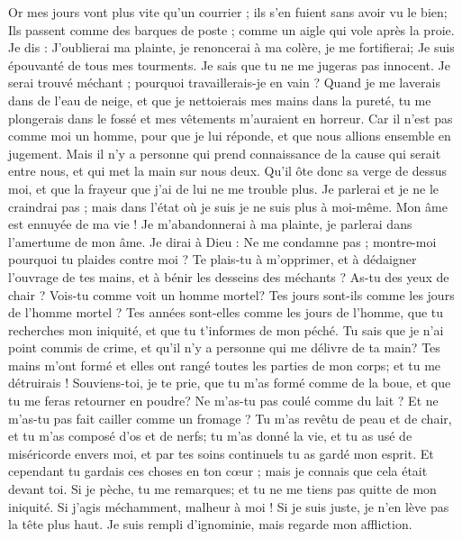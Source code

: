 \begin{multicols}{2}
Or mes jours vont plus vite qu'un courrier ; ils s'en fuient sans avoir vu le bien;
Ils passent comme des barques de poste ; comme un aigle qui vole après la proie.
 Je dis : J'oublierai ma plainte, je renoncerai à ma colère, je me fortifierai; 
Je suis épouvanté de tous mes tourments. Je sais que tu ne me jugeras pas innocent.
Je serai trouvé méchant ; pourquoi travaillerais-je en vain ?
Quand je me laverais dans de l'eau de neige, et que je nettoierais mes mains dans la pureté, 
tu me plongerais dans le fossé et mes vêtements m'auraient en horreur.
Car il n'est pas comme moi un homme, pour que je lui réponde, et que nous allions ensemble en jugement.
Mais il n'y a personne qui prend connaissance de la cause qui serait entre nous, et qui met la main sur nous deux.
Qu'il ôte donc sa verge de dessus moi, et que la frayeur que j'ai de lui ne me trouble plus.
Je parlerai et je ne le craindrai pas ; mais dans l'état où je suis je ne suis plus à moi-même. 
\VerseOne{}Mon âme est ennuyée de ma vie ! Je m'abandonnerai à ma plainte, je parlerai dans l'amertume de mon âme.
Je dirai à Dieu : Ne me condamne pas ; montre-moi pourquoi tu plaides contre moi ?
Te plais-tu à m'opprimer, et à dédaigner l'ouvrage de tes mains, et à bénir les desseins des méchants ?
As-tu des yeux de chair ? Vois-tu comme voit un homme mortel?
Tes jours sont-ils comme les jours de l'homme mortel ? Tes années sont-elles comme les jours de l'homme, 
que tu recherches mon iniquité, et que tu t'informes de mon péché.
Tu sais que je n'ai point commis de crime, et qu'il n'y a personne qui me délivre de ta main?
Tes mains m'ont formé et elles ont rangé toutes les parties de mon corps; et tu me détruirais  !
Souviens-toi, je te prie, que tu m'as formé comme de la boue, et que tu me feras retourner en poudre?
Ne m'as-tu pas coulé comme du lait ? Et ne m'as-tu pas fait cailler comme un fromage ?
Tu m'as revêtu de peau et de chair, et tu m'as composé d'os et de nerfs;
tu m'as donné la vie, et tu as usé de miséricorde envers moi, et par tes soins continuels tu as gardé mon esprit.
Et cependant tu gardais ces choses en ton cœur ; mais je connais que cela était devant toi. 
Si je pèche, tu me remarques; et tu ne me tiens pas quitte de mon iniquité.
Si j'agis méchamment, malheur à moi ! Si je suis juste, je n'en lève pas la tête plus haut. Je suis rempli d'ignominie, mais regarde mon affliction. 

\end{multicols}
